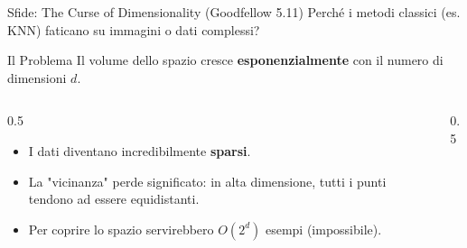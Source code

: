 \documentclass[aspectratio=169, 10pt]{beamer}
\begin{document}
\begin{frame}{Sfide: The Curse of Dimensionality (Goodfellow 5.11)}
    Perché i metodi classici (es. KNN) faticano su immagini o dati complessi?
    
    \begin{alertblock}{Il Problema}
        Il volume dello spazio cresce \textbf{esponenzialmente} con il numero di dimensioni $d$.
    \end{alertblock}
    
    \begin{columns}
        \begin{column}{0.5\textwidth}
            \begin{itemize}
                \item I dati diventano incredibilmente \textbf{sparsi}.
                \item La "vicinanza" perde significato: in alta dimensione, tutti i punti tendono ad essere equidistanti.
                \item Per coprire lo spazio servirebbero $O(2^d)$ esempi (impossibile).
            \end{itemize}
        \end{column}
        \begin{column}{0.5\textwidth}
            \centering
        \end{column}
    \end{columns}
\end{frame}
\end{document}
